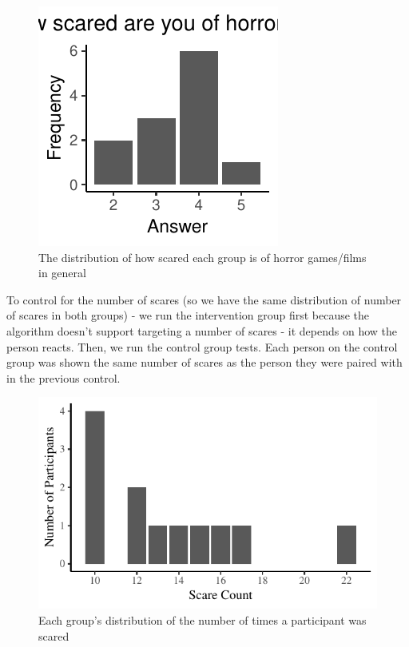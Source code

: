 \documentclass[12pt,a4paper]{article}\usepackage[]{graphicx}\usepackage[]{color}
\makeatletter
\def\maxwidth{ %
  \ifdim\Gin@nat@width>\linewidth
    \linewidth
  \else
    \Gin@nat@width
  \fi
}
\makeatother
\begin{document}
\begin{figure}[htb]


{\centering \includegraphics[width=\maxwidth]{figure/ParticipantScaredness-1} 

}



\caption{The distribution of how scared each group is of horror games/films in general}
\label{fig:ParticipantScaredness}
\end{figure}

To control for the number of scares (so we have the same distribution of number of scares in both groups) - we run the intervention group first because the algorithm doesn't support targeting a number of scares - it depends on how the person reacts.
Then, we run the control group tests. Each person on the control group was shown the same number of scares as the person they were paired with in the previous control.

\begin{figure}[htb]


{\centering \includegraphics[width=\maxwidth]{figure/ParticipantScares-1} 

}



\caption{Each group's distribution of the number of times a participant was scared}
\label{fig:ParticipantScares}
\end{figure}
\end{document}
